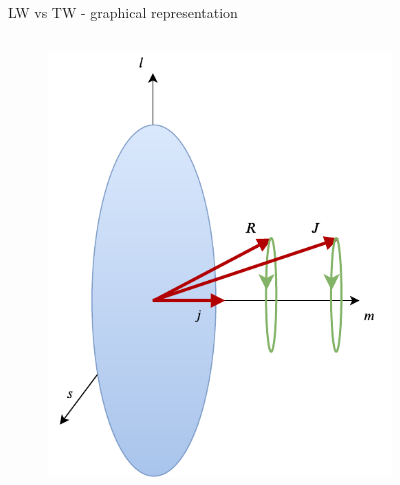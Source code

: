\documentclass{beamer}
\begin{document}
\begin{frame}{LW vs TW - graphical representation}
  \begin{columns}
    \begin{column}{0.5\textwidth}  %
      \begin{figure}
        \centering
        \includegraphics[scale=0.6]{figs/LongitudinalWobbler.pdf}
      \end{figure}
    \end{column}
    \begin{column}{0.5\textwidth}
      \begin{figure}
        \centering

\end{figure}
\end{column}
\end{columns}
\end{frame}
\end{document}

